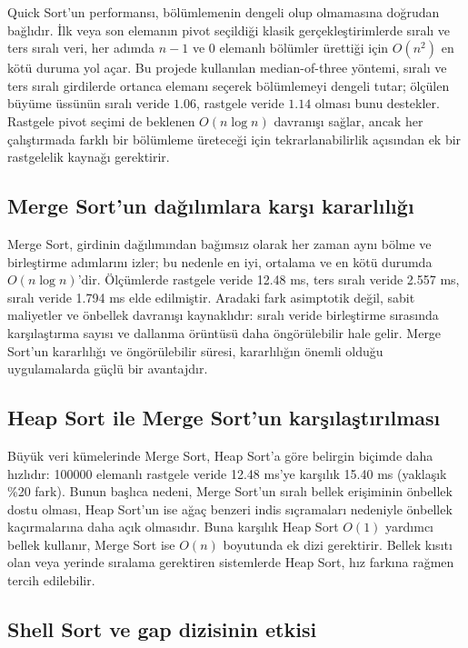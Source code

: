 \documentclass[12pt,a4paper]{article}
\begin{document}
Quick Sort'un performansı, bölümlemenin dengeli olup olmamasına doğrudan
bağlıdır. İlk veya son elemanın pivot seçildiği klasik gerçekleştirimlerde
sıralı ve ters sıralı veri, her adımda $n-1$ ve $0$ elemanlı bölümler ürettiği
için $O(n^2)$ en kötü duruma yol açar. Bu projede kullanılan median-of-three
yöntemi, sıralı ve ters sıralı girdilerde ortanca elemanı seçerek bölümlemeyi
dengeli tutar; ölçülen büyüme üssünün sıralı veride $1.06$, rastgele veride
$1.14$ olması bunu destekler. Rastgele pivot seçimi de beklenen $O(n \log n)$
davranışı sağlar, ancak her çalıştırmada farklı bir bölümleme üreteceği için
tekrarlanabilirlik açısından ek bir rastgelelik kaynağı gerektirir.

\subsection{Merge Sort'un dağılımlara karşı kararlılığı}

Merge Sort, girdinin dağılımından bağımsız olarak her zaman aynı bölme ve
birleştirme adımlarını izler; bu nedenle en iyi, ortalama ve en kötü durumda
$O(n \log n)$'dir. Ölçümlerde rastgele veride 12.48 ms, ters sıralı veride
2.557 ms, sıralı veride 1.794 ms elde edilmiştir. Aradaki fark asimptotik
değil, sabit maliyetler ve önbellek davranışı kaynaklıdır: sıralı veride
birleştirme sırasında karşılaştırma sayısı ve dallanma örüntüsü daha öngörülebilir
hale gelir. Merge Sort'un kararlılığı ve öngörülebilir süresi, kararlılığın
önemli olduğu uygulamalarda güçlü bir avantajdır.

\subsection{Heap Sort ile Merge Sort'un karşılaştırılması}

Büyük veri kümelerinde Merge Sort, Heap Sort'a göre belirgin biçimde daha
hızlıdır: 100000 elemanlı rastgele veride 12.48 ms'ye karşılık 15.40 ms
(yaklaşık \%20 fark). Bunun başlıca nedeni, Merge Sort'un sıralı bellek
erişiminin önbellek dostu olması, Heap Sort'un ise ağaç benzeri indis
sıçramaları nedeniyle önbellek kaçırmalarına daha açık olmasıdır. Buna karşılık
Heap Sort $O(1)$ yardımcı bellek kullanır, Merge Sort ise $O(n)$ boyutunda ek
dizi gerektirir. Bellek kısıtı olan veya yerinde sıralama gerektiren sistemlerde
Heap Sort, hız farkına rağmen tercih edilebilir.

\subsection{Shell Sort ve gap dizisinin etkisi}
\end{document}
